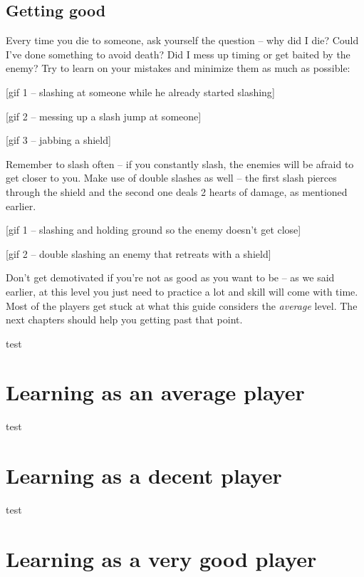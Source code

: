 \documentclass[]{book}
\begin{document}
\hypertarget{getting-good}{%
\section{Getting good}\label{getting-good}}

Every time you die to someone, ask yourself the question -- why did I die? Could I've done something to avoid death? Did I mess up timing or get baited by the enemy? Try to learn on your mistakes and minimize them as much as possible:

{[}gif 1 -- slashing at someone while he already started slashing{]}

{[}gif 2 -- messing up a slash jump at someone{]}

{[}gif 3 -- jabbing a shield{]}

Remember to slash often -- if you constantly slash, the enemies will be afraid to get closer to you. Make use of double slashes as well -- the first slash pierces through the shield and the second one deals 2 hearts of damage, as mentioned earlier.

{[}gif 1 -- slashing and holding ground so the enemy doesn't get close{]}

{[}gif 2 -- double slashing an enemy that retreats with a shield{]}

Don't get demotivated if you're not as good as you want to be -- as we said earlier, at this level you just need to practice a lot and skill will come with time. Most of the players get stuck at what this guide considers the \emph{average} level. The next chapters should help you getting past that point.

test

\hypertarget{learning-as-an-average-player}{%
\chapter{Learning as an average player}\label{learning-as-an-average-player}}

test

\hypertarget{learning-as-a-decent-player}{%
\chapter{Learning as a decent player}\label{learning-as-a-decent-player}}

test

\hypertarget{learning-as-a-very-good-player}{%
\chapter{Learning as a very good player}\label{learning-as-a-very-good-player}}
\end{document}
